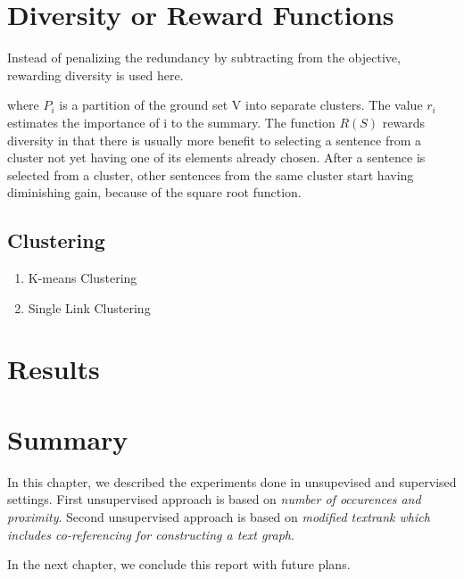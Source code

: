 \section{Diversity or Reward Functions}
Instead of penalizing the redundancy by subtracting from the objective, rewarding diversity is used here.


where $P_i$ is a partition of the ground set V into separate clusters. The value $r_i$ estimates the importance of i to
the summary. The function $R(S)$ rewards diversity in that there is usually more benefit to selecting a sentence from a cluster not yet having one of its
elements already chosen. After a sentence is selected from a cluster, other sentences from the same cluster start having diminishing gain, because of the square root function. 


\subsection{Clustering}

\begin{enumerate}
	\item K-means Clustering
	\item Single Link Clustering
\end{enumerate}

\section{Results}

\section{Summary}
In this chapter, we described the experiments done in unsupevised and supervised settings. First unsupervised approach is based on \textit{number of occurences and proximity}. Second unsupervised approach is based on \textit{ modified textrank which includes co-referencing for constructing a text graph}. 


In the next chapter,  we conclude this report with future plans.